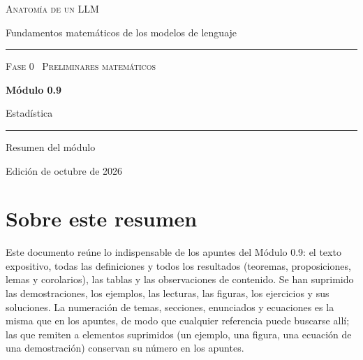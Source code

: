 \documentclass[11pt,a4paper,twoside,openany]{book}
\begin{document}
\frontmatter
\begin{titlepage}
\centering
\vspace*{2.5cm}
{\large\scshape Anatomía de un LLM}\par
\vspace{0.4cm}
{\normalsize Fundamentos matemáticos de los modelos de lenguaje}\par
\vspace{2.2cm}
\rule{\textwidth}{0.8pt}\par\vspace{0.5cm}
{\small\scshape Fase 0 \textperiodcentered\ Preliminares matemáticos}\par\vspace{0.3cm}
{\Huge\bfseries Módulo 0.9\par}\vspace{0.3cm}
{\LARGE Estadística\par}
\vspace{0.5cm}\rule{\textwidth}{0.4pt}\par
\vspace{1.6cm}
{\large Resumen del módulo}\par
\vfill
{\small Edición de octubre de 2026}\par
\end{titlepage}

\chapter*{Sobre este resumen}

Este documento reúne lo indispensable de los apuntes del Módulo 0.9: el texto expositivo, todas las definiciones y todos los resultados (teoremas, proposiciones, lemas y corolarios), las tablas y las observaciones de contenido. Se han suprimido las demostraciones, los ejemplos, las lecturas, las figuras, los ejercicios y sus soluciones. La numeración de temas, secciones, enunciados y ecuaciones es la misma que en los apuntes, de modo que cualquier referencia puede buscarse allí; las que remiten a elementos suprimidos (un ejemplo, una figura, una ecuación de una demostración) conservan su número en los apuntes.
\end{document}
